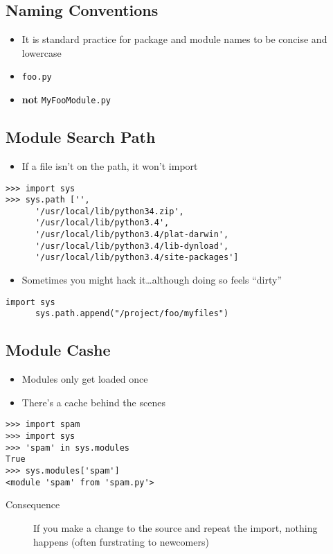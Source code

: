 \documentclass[11pt]{article}
\begin{document}
\subsection*{Naming Conventions}
\label{sec:orgheadline8}
\begin{itemize}
\item It is standard practice for package and module
names to be concise and lowercase
\item \texttt{foo.py}
\item \textbf{not} \texttt{MyFooModule.py}
\end{itemize}
\subsection*{Module Search Path}
\label{sec:orgheadline9}
\begin{itemize}
\item If a file isn't on the path, it won't import
\end{itemize}
\begin{verbatim}
>>> import sys
>>> sys.path ['',
      '/usr/local/lib/python34.zip',
      '/usr/local/lib/python3.4',
      '/usr/local/lib/python3.4/plat-darwin',
      '/usr/local/lib/python3.4/lib-dynload',
      '/usr/local/lib/python3.4/site-packages']
\end{verbatim}
\begin{itemize}
\item Sometimes you might hack it\ldots{}although doing so
feels ``dirty''
\end{itemize}
\begin{verbatim}
import sys
      sys.path.append("/project/foo/myfiles")
\end{verbatim}

\subsection*{Module Cashe}
\label{sec:orgheadline10}
\begin{itemize}
\item Modules only get loaded once
\item There's a cache behind the scenes
\end{itemize}
\begin{verbatim}
>>> import spam
>>> import sys
>>> 'spam' in sys.modules
True
>>> sys.modules['spam']
<module 'spam' from 'spam.py'>
\end{verbatim}
\begin{description}
\item[{Consequence}] If you make a change to the source
and repeat the import, nothing happens (often
furstrating to newcomers)
\end{description}
\end{document}

